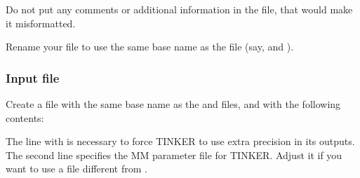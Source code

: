 \documentclass[letterpaper,10pt,english]{sphinxmanual}
\begin{document}
Do not put any comments or additional information in the  file,
that would make it misformatted.

Rename your  file to use the same base name as the  file
(say,  and ).


\subsubsection{Input  file}
\label{\detokenize{tinktep:input-key-file}}
Create a  file with the same base name as the  and
 files, and with the following contents:

%
\begin{sphinxVerbatim}[commandchars=\\\{\}]
 
 
\end{sphinxVerbatim}

The line with  is necessary to force TINKER to use extra
precision in its outputs. The second line specifies the MM parameter
file for TINKER. Adjust it if you want to use a file different from
.
\end{document}
